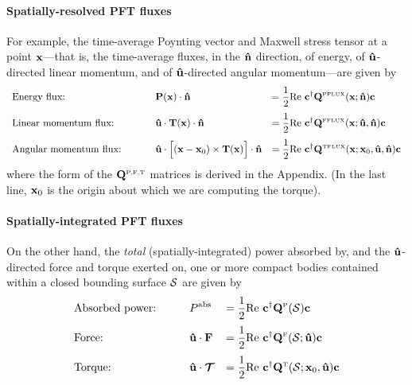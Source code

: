 \documentclass[letterpaper]{article}
\begin{document}
\paragraph{Spatially-resolved PFT fluxes} 
For example, the time-average Poynting vector and Maxwell stress 
tensor at a point $\mathbf{x}$---that is, the time-average fluxes,
in the $\mathbf{\hat n}$ direction, of energy, of $\mathbf{\hat u}$-directed
linear momentum, and of $\mathbf{\hat u}$-directed angular momentum---are
given by
$$\begin{array}{*3{>{\displaystyle}l}}
\text{Energy flux: } \qquad 
&\vb P(\vb x) \cdot \vbhat{n} 
&=\frac{1}{2}\text{Re }
   \vb c^\dagger \vb Q\supt{PFLUX}(\vb x; \vbhat{n}) \vb c
\\[10pt]
\text{Linear momentum flux: } \qquad 
&\vbhat{u} \cdot \vb T(\vb x) \cdot \vbhat{n}
&=\frac{1}{2}\text{Re }
   \vb c^\dagger \vb Q\supt{FFLUX}(\vb x; \vbhat{u}, \vbhat{n}) \vb c
\\[10pt]
\text{Angular momentum flux: } \qquad 
&\vbhat{u} \cdot \Big[(\vb x-\vb x_0) \times \vb T(\vb x)\Big] \cdot \vbhat{n}
&=\frac{1}{2}\text{Re }
   \vb c^\dagger \vb Q\supt{TFLUX}(\vb x; \vb x_0, \vbhat{u}, \vbhat{n}) \vb c
\end{array}$$
where the form of the $\mathbf{Q}^{\hbox{\tiny{P,F,T}}}$ matrices is derived in
the Appendix. (In the last line, $\mathbf{x}_0$ is the origin about which 
we are computing the torque).

\paragraph{Spatially-integrated PFT fluxes} 
On the other hand, the \textit{total} (spatially-integrated)
power absorbed by, and the $\mathbf{\hat u}$-directed force and torque 
exerted on, one or more compact bodies contained within a 
closed bounding surface $\mathcal{S}$ are given by 
$$\begin{array}{*3{>{\displaystyle}l}}
\text{Absorbed power:} \qquad 
& P\sups{abs}
&=\frac{1}{2}\text{Re }
   \vb c^\dagger \vb Q\supt{P}(\mc S) \vb c
\\[10pt]
\text{Force: } \qquad 
&\vbhat{u} \cdot \vb F
&=\frac{1}{2}\text{Re }
   \vb c^\dagger \vb Q\supt{F}(\mc S; \vbhat{u}) \vb c
\\[10pt]
\text{Torque: } \qquad 
&\vbhat{u} \cdot \bmc T
&=\frac{1}{2}\text{Re }
   \vb c^\dagger \vb Q\supt{T}(\mc S; \vb x_0, \vbhat{u}) \vb c
\end{array}$$
\end{document}
